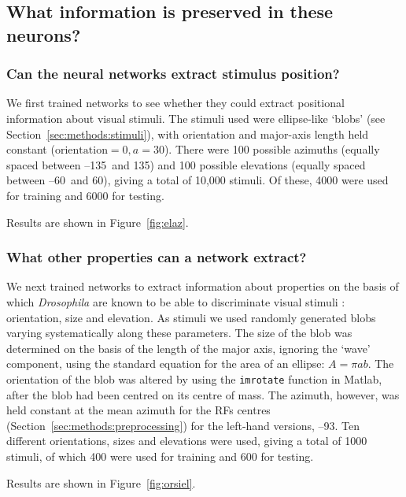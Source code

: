 \subsection*{What information is preserved in these neurons?}

\subsubsection*{Can the neural networks extract stimulus position?}
We first trained networks to see whether they could extract positional information about visual stimuli.
The stimuli used were ellipse-like `blobs' (see Section~\ref{sec:methods:stimuli}), with orientation and major-axis length held constant ($\mathrm{orientation} = 0, a = 30$).
There were 100 possible azimuths (equally spaced between --135\degree\ and 135\degree) and 100 possible elevations (equally spaced between --60\degree\ and 60\degree), giving a total of 10,000 stimuli.
Of these, 4000 were used for training and 6000 for testing.

Results are shown in Figure~\ref{fig:elaz}.

\subsubsection*{What other properties can a network extract?}
We next trained networks to extract information about properties on the basis of which \emph{Drosophila} are known to be able to discriminate visual stimuli \cite{Liu2006}: orientation, size and elevation.
As stimuli we used randomly generated blobs varying systematically along these parameters.
The size of the blob was determined on the basis of the length of the major axis, ignoring the `wave' component, using the standard equation for the area of an ellipse: $A = \pi ab$.
The orientation of the blob was altered by using the \texttt{imrotate} function in Matlab, after the blob had been centred on its centre of mass.
The azimuth, however, was held constant at the mean azimuth for the RFs centres (Section~\ref{sec:methods:preprocessing}) for the left-hand versions, --93\degree.
Ten different orientations, sizes and elevations were used, giving a total of 1000 stimuli, of which 400 were used for training and 600 for testing.

Results are shown in Figure~\ref{fig:orsiel}.